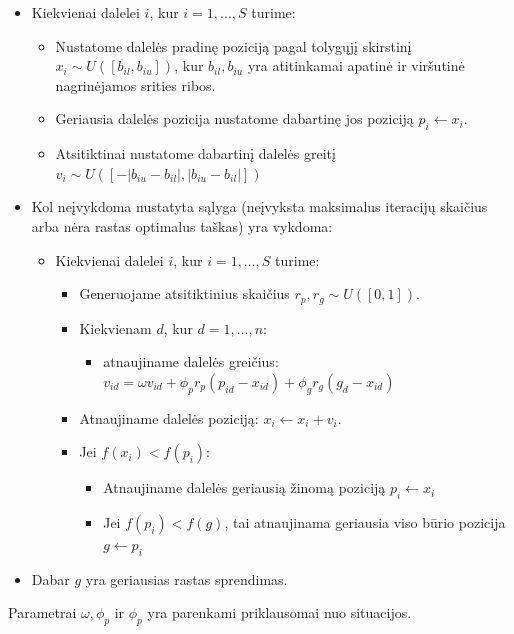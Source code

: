 \documentclass[12pt,a4paper]{article}
\begin{document}
\begin{itemize}
\item Kiekvienai dalelei $i$, kur $i = 1,..., S$ turime:

\begin{itemize}
\item Nustatome dalelės pradinę poziciją pagal tolygųjį skirstinį $x_i \sim U([b_{il}, b_{iu}])$, kur $b_{il}, b_{iu}$ yra atitinkamai apatinė ir viršutinė nagrinėjamos srities ribos.
\item Geriausia dalelės pozicija nustatome dabartinę jos poziciją $p_i \leftarrow x_i $.
\item Atsitiktinai nustatome dabartinį dalelės greitį $v_i \sim U([-|b_{iu}-b_{il}|, |b_{iu}-b_{il}|])$
\end{itemize}

\item Kol neįvykdoma nustatyta sąlyga (neįvyksta maksimalus iteracijų skaičius arba nėra rastas optimalus taškas) yra vykdoma:

\begin{itemize}
\item Kiekvienai dalelei $i$, kur $i = 1,..., S$ turime:
\begin{itemize}
\item Generuojame atsitiktinius skaičius $r_p, r_g \sim U([0,1])$.
\item Kiekvienam $d$, kur $d = 1,..., n$:
\begin{itemize}
\item atnaujiname dalelės greičius: $v_{id} = \omega v_{id} + \phi_p r_p (p_{id} - x_{id}) + \phi_g r_g (g_{d} - x_{id}) $ 
\end{itemize}
\item Atnaujiname dalelės poziciją: $x_i \leftarrow x_i + v_i$.
\item Jei $ f(x_i) < f(p_i) $:
\begin{itemize}
\item Atnaujiname dalelės geriausią žinomą poziciją $p_i \leftarrow x_i $
\item Jei $ f(p_i) < f(g) $, tai atnaujinama geriausia viso būrio pozicija $g \leftarrow p_i $
\end{itemize}
\end{itemize}
\end{itemize}
\item Dabar $g$ yra geriausias rastas sprendimas.
\end{itemize}


Parametrai $\omega, \phi_p$ ir $\phi_p$ yra parenkami priklausomai nuo situacijos. 
\end{document}
